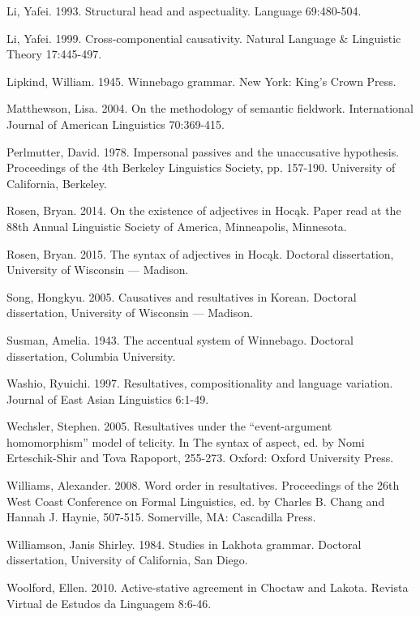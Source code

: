 \documentclass[output=paper]{LSP/langsci}
\begin{document}
\begin{reflist}
Li, Yafei. 1993. Structural head and aspectuality. Language 69:480-504.

Li, Yafei. 1999. Cross-componential causativity. Natural Language \& Linguistic Theory 17:445-497.

Lipkind, William. 1945. Winnebago grammar. New York: King's Crown Press.

Matthewson, Lisa. 2004. On the methodology of semantic fieldwork. International Journal of American Linguistics 70:369-415.

Perlmutter, David. 1978. Impersonal passives and the unaccusative hypothesis. Proceedings of the 4th Berkeley Linguistics Society, pp. 157-190. University of California, Berkeley.

Rosen, Bryan. 2014. On the existence of adjectives in Hoc\k{a}k. Paper read at the 88th Annual Linguistic Society of America, Minneapolis, Minnesota.

Rosen, Bryan. 2015. The syntax of adjectives in Hoc\k{a}k. Doctoral dissertation, University of Wisconsin --- Madison.

Song, Hongkyu. 2005. Causatives and resultatives in Korean. Doctoral dissertation, University of Wisconsin --- Madison.

Susman, Amelia. 1943. The accentual system of Winnebago. Doctoral dissertation, Columbia University.

Washio, Ryuichi. 1997. Resultatives, compositionality and language variation. Journal of East Asian Linguistics 6:1-49.

Wechsler, Stephen. 2005. Resultatives under the ``event-argument homomorphism'' model of telicity. In The syntax of aspect, ed. by Nomi Erteschik-Shir and Tova Rapoport, 255-273. Oxford: Oxford University Press.

Williams, Alexander. 2008. Word order in resultatives. Proceedings of the 26th West Coast Conference on Formal Linguistics, ed. by Charles B. Chang and Hannah J. Haynie, 507-515. Somerville, MA: Cascadilla Press.

Williamson, Janis Shirley. 1984. Studies in Lakhota grammar. Doctoral dissertation, University of California, San Diego.

Woolford, Ellen. 2010. Active-stative agreement in Choctaw and Lakota. Revista Virtual de Estudos da Linguagem 8:6-46.

\end{reflist}
\end{document}
